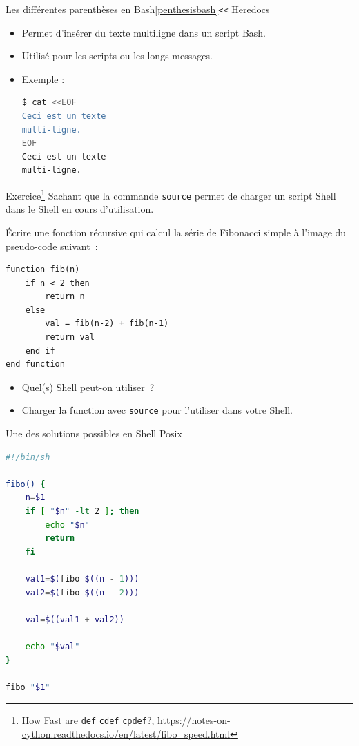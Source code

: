 \documentclass{beamer}
\begin{document}
    \begin{frame}[fragile]{Les différentes parenthèses en Bash\cref{penthesisbash}}{\lstinline{<<} Heredocs}
        \begin{itemize}
            \item Permet d'insérer du texte multiligne dans un script Bash.
            \item Utilisé pour les scripts ou les longs messages.
            \item Exemple :
            \begin{lstlisting}[language=bash]
$ cat <<EOF
Ceci est un texte
multi-ligne.
EOF
Ceci est un texte
multi-ligne.
            \end{lstlisting}
        \end{itemize}
    \end{frame}

    \begin{frame}[fragile]{Exercice\footnote{\label{fibo-ross}How Fast are \lstinline{def} \lstinline{cdef} \lstinline{cpdef}?, \url{https://notes-on-cython.readthedocs.io/en/latest/fibo_speed.html}} \execcounterdispinc{}}
        Sachant que la commande \lstinline{source} permet de charger un script Shell dans le Shell en cours d'utilisation.

        Écrire une fonction récursive qui calcul la série de Fibonacci simple à l'image du pseudo-code suivant~:
        \begin{footnotesize}
            \begin{verbatim}
function fib(n)
    if n < 2 then
        return n
    else
        val = fib(n-2) + fib(n-1)
        return val
    end if
end function
            \end{verbatim}
        \end{footnotesize}
        \begin{itemize}
            \item Quel(s) Shell peut-on utiliser~?
            \item Charger la function avec \lstinline{source} pour l'utiliser dans votre Shell.
        \end{itemize}
    \end{frame}

    \begin{frame}[fragile]{Une des solutions possibles en Shell Posix}
        \begin{lstlisting}[language=bash]
#!/bin/sh

fibo() {
    n=$1
    if [ "$n" -lt 2 ]; then
        echo "$n"
        return
    fi

    val1=$(fibo $((n - 1)))
    val2=$(fibo $((n - 2)))

    val=$((val1 + val2))

    echo "$val"
}

fibo "$1"
        \end{lstlisting}
    \end{frame}
\end{document}
